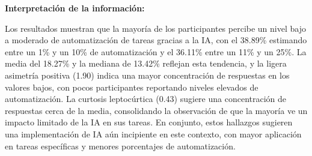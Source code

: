 \noindent\textbf{Interpretación de la información:}

Los resultados muestran que la mayoría de los participantes percibe un nivel bajo a moderado de automatización de tareas gracias a la IA, con el 38.89\% estimando entre un 1\% y un 10\% de automatización y el 36.11\% entre un 11\% y un 25\%. La media del 18.27\% y la mediana de 13.42\% reflejan esta tendencia, y la ligera asimetría positiva (1.90) indica una mayor concentración de respuestas en los valores bajos, con pocos participantes reportando niveles elevados de automatización. La curtosis leptocúrtica (0.43) sugiere una concentración de respuestas cerca de la media, consolidando la observación de que la mayoría ve un impacto limitado de la IA en sus tareas. En conjunto, estos hallazgos sugieren una implementación de IA aún incipiente en este contexto, con mayor aplicación en tareas específicas y menores porcentajes de automatización.
